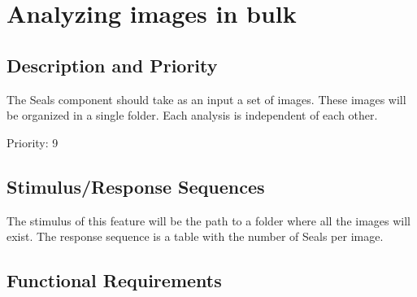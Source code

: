 \documentclass{scrreprt}
\begin{document}
\section{Analyzing images in bulk}

\subsection{Description and Priority}

The Seals component should take as an input a set of images. These images will be
organized in a single folder. Each analysis is independent of each other.

Priority: 9

\subsection{Stimulus/Response Sequences}

The stimulus of this feature will be the path to a folder where all the images 
will exist. The response sequence is a table with the number of Seals per image.

\subsection{Functional Requirements}

\end{document}
